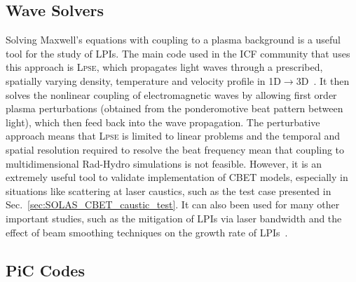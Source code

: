 \subsection{Wave Solvers}

Solving Maxwell's equations with coupling to a plasma background is a useful tool for the study of \ac{LPIs}.
The main code used in the \ac{ICF} community that uses this approach is \textsc{Lpse}, which propagates light waves through a prescribed, spatially varying density, temperature and velocity profile in 1D$\rightarrow$3D~\cite{myatt_wave-based_2017,myatt_lpse_2019}.
It then solves the nonlinear coupling of electromagnetic waves by allowing first order plasma perturbations (obtained from the ponderomotive beat pattern between light), which then feed back into the wave propagation.
The perturbative approach means that \textsc{Lpse} is limited to linear problems and the temporal and spatial resolution required to resolve the beat frequency mean that coupling to multidimensional \ac{Rad-Hydro} simulations is not feasible.
However, it is an extremely useful tool to validate implementation of \ac{CBET} models, especially in situations like scattering at laser caustics, such as the test case presented in Sec.~\ref{sec:SOLAS_CBET_caustic_test}.
It can also been used for many other important studies, such as the mitigation of \ac{LPIs} via laser bandwidth and the effect of beam smoothing techniques on the growth rate of \ac{LPIs}~\cite{follett_thresholds_2021}.

\subsection{\ac{PiC} Codes}

